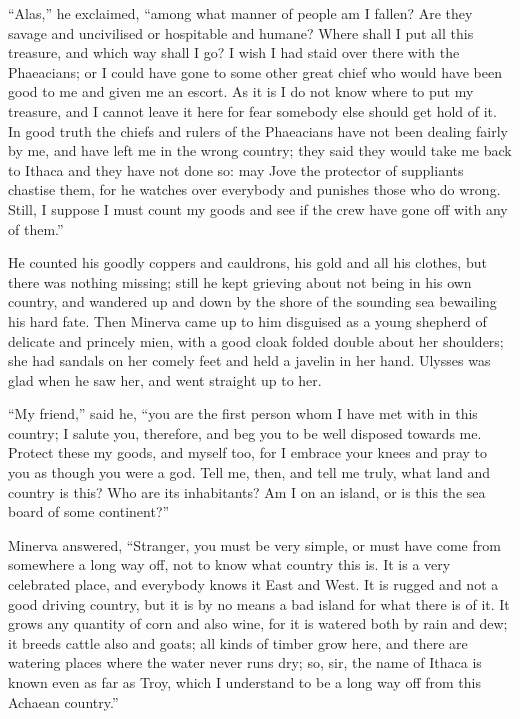 “Alas,” he exclaimed, “among what manner of people am I fallen? Are they savage
and uncivilised or hospitable and humane? Where shall I put all this treasure,
and which way shall I go? I wish I had staid over there with the Phaeacians; or
I could have gone to some other great chief who would have been good to me and
given me an escort. As it is I do not know where to put my treasure, and I
cannot leave it here for fear somebody else should get hold of it. In good
truth the chiefs and rulers of the Phaeacians have not been dealing fairly by
me, and have left me in the wrong country; they said they would take me back to
Ithaca and they have not done so: may Jove the protector of suppliants chastise
them, for he watches over everybody and punishes those who do wrong. Still, I
suppose I must count my goods and see if the crew have gone off with any of
them.”

He counted his goodly coppers and cauldrons, his gold and all his clothes, but
there was nothing missing; still he kept grieving about not being in his own
country, and wandered up and down by the shore of the sounding sea bewailing
his hard fate. Then Minerva came up to him disguised as a young shepherd of
delicate and princely mien, with a good cloak folded double about her
shoulders; she had sandals on her comely feet and held a javelin in her hand.
Ulysses was glad when he saw her, and went straight up to her.

“My friend,” said he, “you are the first person whom I have met with in this
country; I salute you, therefore, and beg you to be well disposed towards me.
Protect these my goods, and myself too, for I embrace your knees and pray to
you as though you were a god. Tell me, then, and tell me truly, what land and
country is this? Who are its inhabitants? Am I on an island, or is this the sea
board of some continent?”

Minerva answered, “Stranger, you must be very simple, or must have come from
somewhere a long way off, not to know what country this is. It is a very
celebrated place, and everybody knows it East and West. It is rugged and not a
good driving country, but it is by no means a bad island for what there is of
it. It grows any quantity of corn and also wine, for it is watered both by rain
and dew; it breeds cattle also and goats; all kinds of timber grow here, and
there are watering places where the water never runs dry; so, sir, the name of
Ithaca is known even as far as Troy, which I understand to be a long way off
from this Achaean country.”

